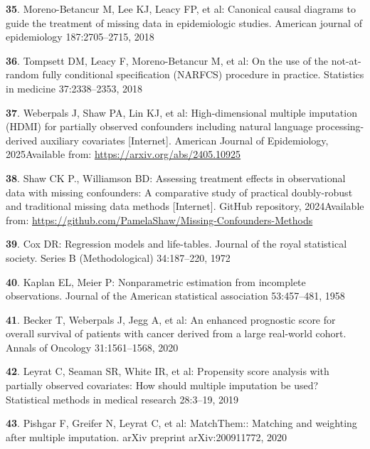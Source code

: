 \documentclass[
  letterpaper,
  DIV=11,
  numbers=noendperiod]{scrartcl}
\newlength{\cslhangindent}
\newenvironment{CSLReferences}[2] %
 {\begin{list}{}{%
  \setlength{\itemindent}{0pt}
  \setlength{\leftmargin}{0pt}
  \setlength{\parsep}{0pt}
  \ifodd #1
   \setlength{\leftmargin}{\cslhangindent}
   \setlength{\itemindent}{-1\cslhangindent}
  \fi
  \setlength{\itemsep}{#2\baselineskip}}}
 {\end{list}}
\begin{document}
\begin{CSLReferences}{0}{1}
\textbf{35}. Moreno-Betancur M, Lee KJ, Leacy FP, et al: Canonical
causal diagrams to guide the treatment of missing data in epidemiologic
studies. American journal of epidemiology 187:2705--2715, 2018

\textbf{36}. Tompsett DM, Leacy F, Moreno-Betancur M, et al: On the use
of the not-at-random fully conditional specification (NARFCS) procedure
in practice. Statistics in medicine 37:2338--2353, 2018

\textbf{37}. Weberpals J, Shaw PA, Lin KJ, et al: High-dimensional
multiple imputation (HDMI) for partially observed confounders including
natural language processing-derived auxiliary covariates {[}Internet{]}.
American Journal of Epidemiology, 2025Available from:
\url{https://arxiv.org/abs/2405.10925}

\textbf{38}. Shaw CK P., Williamson BD: Assessing treatment effects in
observational data with missing confounders: A comparative study of
practical doubly-robust and traditional missing data methods
{[}Internet{]}. GitHub repository, 2024Available from:
\url{https://github.com/PamelaShaw/Missing-Confounders-Methods}

\textbf{39}. Cox DR: Regression models and life-tables. Journal of the
royal statistical society. Series B (Methodological) 34:187--220, 1972

\textbf{40}. Kaplan EL, Meier P: Nonparametric estimation from
incomplete observations. Journal of the American statistical association
53:457--481, 1958

\textbf{41}. Becker T, Weberpals J, Jegg A, et al: An enhanced
prognostic score for overall survival of patients with cancer derived
from a large real-world cohort. Annals of Oncology 31:1561--1568, 2020

\textbf{42}. Leyrat C, Seaman SR, White IR, et al: Propensity score
analysis with partially observed covariates: How should multiple
imputation be used? Statistical methods in medical research 28:3--19,
2019

\textbf{43}. Pishgar F, Greifer N, Leyrat C, et al: MatchThem:: Matching
and weighting after multiple imputation. arXiv preprint arXiv:200911772,
2020


\end{CSLReferences}
\end{document}
